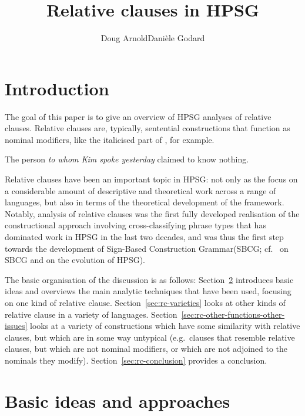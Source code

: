 \documentclass[output=paper,biblatex,babelshorthands,newtxmath,draftmode,colorlinks,citecolor=brown]{langscibook}
\title{Relative clauses in HPSG}
\author{Doug Arnold\affiliation{University of Essex}\lastand Danièle Godard\affiliation{Université de Paris, Centre national de la recherche scientifique (CNRS)}}
\begin{document}
\maketitle
\label{chap-relative-clauses}

\section{Introduction}
\label{sec:rc-introduction}

The goal of this paper is to give an overview of HPSG analyses of
relative clauses. Relative clauses are, typically, sentential constructions that function as nominal
modifiers, like the italicised part of , for example.
\begin{exe}\ex
    \label{x:rc-1} The person \emph{to whom Kim spoke yesterday} claimed to know nothing.
\end{exe}
Relative clauses have been an important topic in HPSG: not only as the focus on a
considerable amount of descriptive and theoretical work across a range of languages, but
also in terms of the theoretical development of the framework. Notably, 
analysis of  relative clauses was the first fully developed realisation of the
constructional approach involving cross-classifying phrase types that has dominated work
in HPSG in the last two decades, and was thus the first step towards the development of
Sign-Based Construction Grammar\indexsbcg (SBCG; cf.\ 
on SBCG and  on the evolution of HPSG).

The basic organisation of the discussion is as follows: Section~\ref{sec:rc-approaches}
introduces basic ideas and overviews the main analytic techniques that have been used, focusing
on one kind of relative clause. Section~\ref{sec:rc-varieties} looks at other kinds of
relative clause in a variety of languages. Section~\ref{sec:rc-other-functions-other-issues}
looks at a variety of constructions which have some similarity with relative clauses, but which are in
some way untypical (e.g.\ clauses that resemble relative clauses, but which are not
nominal modifiers, or which are not adjoined to the nominals they
modify). Section~\ref{sec:rc-conclusion} provides a conclusion.

\section{Basic ideas and approaches}
\label{sec:rc-approaches}
\end{document}
